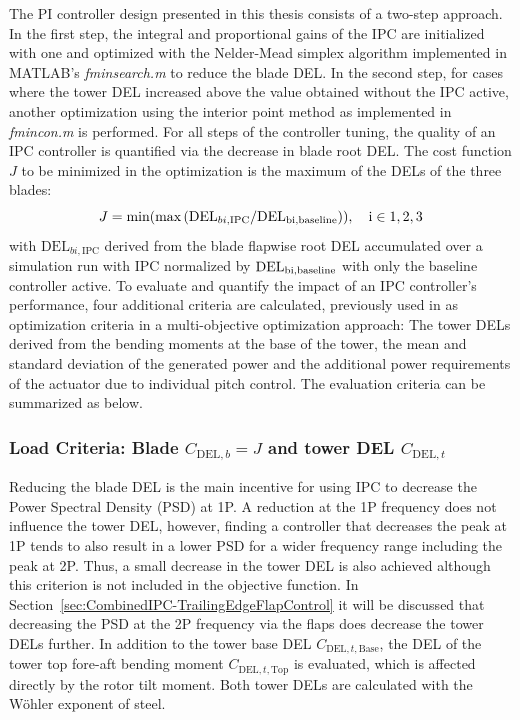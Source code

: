 The PI controller design presented in this thesis consists of a two-step approach. In the first step, the integral and proportional gains of the IPC are initialized with one and optimized with the Nelder-Mead simplex algorithm implemented in MATLAB's \textit{fminsearch.m} to reduce the blade DEL. In the second step, for cases where the tower DEL increased above the value obtained without the IPC active, another optimization using the interior point method as implemented in \textit{fmincon.m} is performed.
For all steps of the controller tuning, the quality of an IPC controller is quantified via the decrease in blade root DEL. The cost function $J$ to be minimized in the optimization is the maximum of the DELs of the three blades:
\begin{equation} \label{eq:costFunIPC}
    J = \text{min}(\text{max}\left(\text{DEL}_{bi,\text{IPC}}/\text{DEL}_{\text{bi,\text{baseline}}}\right)), \quad \text{i} \in {1,2,3} 
\end{equation} %
with $\text{DEL}_{bi,\text{IPC}}$ derived from the blade flapwise root DEL accumulated over a simulation run with IPC normalized by $\text{DEL}_{\text{bi,\text{baseline}}}$ with only the baseline controller active.
To evaluate and quantify the impact of an IPC controller's performance, four additional criteria are calculated, previously used in \cite{hoffmann2018load} as optimization criteria in a multi-objective optimization approach: The tower DELs derived from the bending moments at the base of the tower, the mean and standard deviation of the generated power and the additional power requirements of the actuator due to individual pitch control. The evaluation criteria can be summarized as below.

\subsubsection*{Load Criteria: Blade $C_{\text{DEL},b} = J$ and tower DEL $C_{\text{DEL},t}$}
Reducing the blade DEL is the main incentive for using IPC to decrease the Power Spectral Density (PSD) at 1P. A reduction at the 1P frequency does not influence the tower DEL, however, finding a controller that decreases the peak at 1P tends to also result in a lower PSD for a wider frequency range including the peak at 2P. Thus, a small decrease in the tower DEL is also achieved although this criterion is not included in the objective function. In Section~\ref{sec:CombinedIPC-TrailingEdgeFlapControl} it will be discussed that decreasing the PSD at the 2P frequency via the flaps does decrease the tower DELs further. In addition to the tower base DEL $C_{\text{DEL},t,\text{Base}}$, the DEL of the tower top fore-aft bending moment $C_{\text{DEL},t,\text{Top}}$ is evaluated, which is affected directly by the rotor tilt moment. Both tower DELs are calculated with the Wöhler exponent of steel. 


